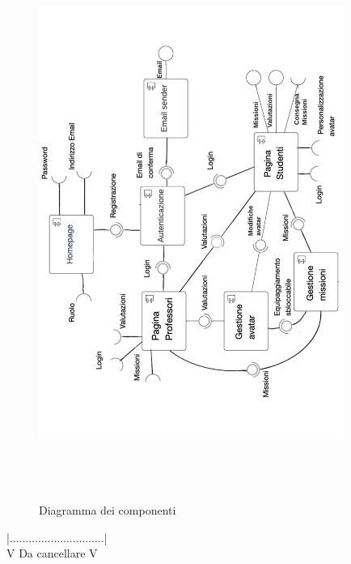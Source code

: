 \begin{figure}[h!]
  \centerline{\includegraphics[height=18cm, width=10cm, angle=270]{figures/componenti.pdf}}
  \caption{Diagramma dei componenti}
\end{figure}

\newpage
|..............................|\\
V Da cancellare V

\cite{learing}
\cite{approach}
\cite{medicina}
\cite{romanzi}
\cite{Dale}
\cite{teaching}
\cite{distribuzione}
\cite{stili}
\cite{game}
\newpage
